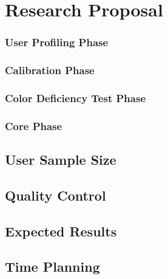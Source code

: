 
\chapter{Research Proposal}
\label{chapter:researchproposal}
%
\subsection{User Profiling Phase}
\label{sec:researchprop_userprofiling}

\subsection{Calibration Phase}
\label{sec:researchprop_colordeficiency}

\subsection{Color Deficiency Test Phase}
\label{sec:researchprop_colordeficiency}

\subsection{Core Phase}
\label{sec:researchprop_corephase}

\section{User Sample Size}
\label{sec:researchprop_samplesize}

\section{Quality Control}
\label{sec:researchprop_qualitycontrol}

\section{Expected Results}
\label{sec:researchprop_expectedresults}

\section{Time Planning}
\label{sec:background_planning}
